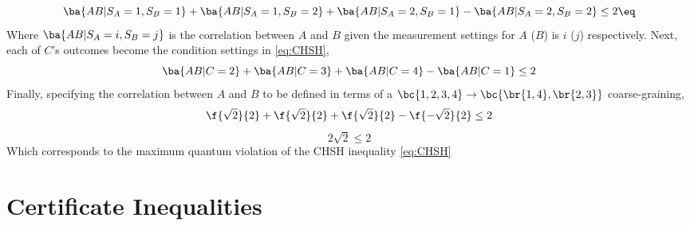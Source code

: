 \documentclass[aps, 10pt, english, twoside, pra, nofootinbib, longbibliography]{revtex4-1}
\theoremstyle{plain}
\theoremstyle{definition}
\theoremstyle{remark}
\begin{document}
    \[ \ba{AB|S_A=1, S_B=1} + \ba{AB|S_A=1, S_B=2} + \ba{AB|S_A=2, S_B=1} - \ba{AB|S_A=2, S_B=2} \leq 2 \eq \label{eq:CHSH}\]
    Where $\ba{AB|S_A=i, S_B=j}$ is the correlation between $A$ and $B$ given the measurement settings for $A$ ($B$) is $i$ ($j$) respectively. Next, each of $C$'s outcomes become the condition settings in \cref{eq:CHSH},
    \[ \ba{AB|C=2} + \ba{AB|C=3} + \ba{AB|C=4} - \ba{AB|C=1} \leq 2 \]
    Finally, specifying the correlation between $A$ and $B$ to be defined in terms of a $\bc{1,2,3,4} \rightarrow \bc{\br{1,4}, \br{2,3}}$ coarse-graining,
    \[ \f{\sqrt{2}}{2} + \f{\sqrt{2}}{2} + \f{\sqrt{2}}{2} - \f{-\sqrt{2}}{2} \leq 2 \]
    \[ 2\sqrt{2} \leq 2 \]
    Which corresponds to the maximum quantum violation of the CHSH inequality \cref{eq:CHSH}

    \section{Certificate Inequalities}
\end{document}
